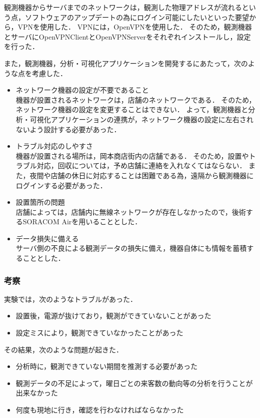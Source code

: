 観測機器からサーバまでのネットワークは，観測した物理アドレスが流れるという点，ソフトウェアのアップデートの為にログイン可能にしたいといった要望から，VPNを使用した．
VPNには，OpenVPNを使用した．
そのため，観測機器とサーバにOpenVPNClientとOpenVPNServerをそれぞれインストールし，設定を行った．

また，観測機器，分析・可視化アプリケーションを開発するにあたって，次のような点を考慮した．
\begin{itemize}
\item ネットワーク機器の設定が不要であること\\
	機器が設置されるネットワークは，店舗のネットワークである．
	そのため，ネットワーク機器の設定を変更することはできない．
	よって，観測機器と分析・可視化アプリケーションの連携が，ネットワーク機器の設定に左右されないよう設計する必要があった．
\item トラブル対応のしやすさ\\
	機器が設置される場所は，岡本商店街内の店舗である．
	そのため，設置やトラブル対応，回収については，予め店舗に連絡を入れなくてはならない．
	また，夜間や店舗の休日に対応することは困難である為，遠隔から観測機器にログインする必要があった．
\item 設置箇所の問題\\
	店舗によっては，店舗内に無線ネットワークが存在しなかったので，後術するSORACOM Airを用いることとした．
\item データ損失に備える\\
	サーバ側の不良による観測データの損失に備え，機器自体にも情報を蓄積することとした．
\end{itemize}

\subsubsection{考察}
実験では，次のようなトラブルがあった．
\begin{itemize}
\item 設置後，電源が抜けており，観測ができていないことがあった
\item 設定ミスにより，観測できていなかったことがあった
\end{itemize}

その結果，次のような問題が起きた．
\begin{itemize}
\item 分析時に，観測できていない期間を推測する必要があった
\item 観測データの不足によって，曜日ごとの来客数の動向等の分析を行うことが出来なかった
\item 何度も現地に行き，確認を行わなければならなかった
\end{itemize}

